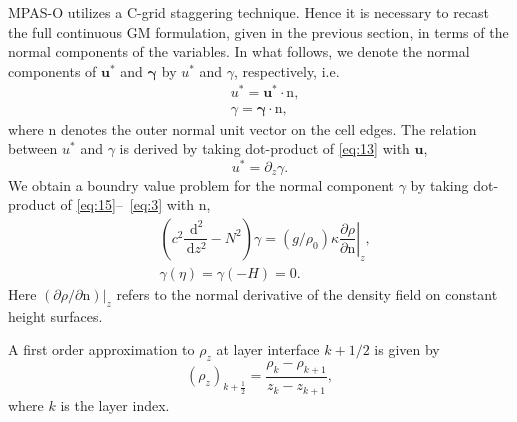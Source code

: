\documentclass[12pt]{report}
\def\p{\partial}
\def\bs{\boldsymbol}
\def\ud{\,\mathrm{d}}
\def\ub{\mathbf{u}}
\def\nb{\bs{\mathrm{n}}}
\begin{document}
MPAS-O utilizes a C-grid staggering technique. Hence it is necessary
to recast the full continuous GM formulation, given in the previous
section, in terms of the normal components of the variables. In what
follows, we denote the normal components of $\ub^\ast$ and
$\bs{\gamma}$ by $u^\ast$ and $\gamma$, respectively, i.e.
\begin{align}
  &u^\ast = \ub^\ast\cdot\nb,\label{eq:16}\\
  &\gamma = \bs{\gamma}\cdot\nb,\label{eq:17}
\end{align}
where $\nb$ denotes the outer normal unit vector on the cell
edges. The relation between $u^\ast$ and $\gamma$ is derived by
taking dot-product of \eqref{eq:13} with $\ub$,
\begin{equation}
  \label{eq:18}
  u^\ast = \p_z \gamma.
\end{equation}
We obtain a boundry value problem for the normal component $\gamma$ by
taking dot-product of \eqref{eq:15}--~\eqref{eq:3} with $\nb$,
\begin{align}
  &\left( c^2\dfrac{\ud^2}{\ud z^2} - N^2\right){\gamma} =
  \left.(g/\rho_0)\kappa \dfrac{\p \rho}{\p \mathrm{n}}\right|_z,\label{eq:19}\\
  &{\gamma}(\eta) = {\gamma}(-H) = 0.\label{eq:20}
\end{align}
Here $(\p \rho/\p\mathrm{n})|_z$ refers to the normal derivative of
the density field on constant height surfaces.


A first order 
approximation to $\rho_z$ at layer interface $k+1/2$ is given by 
\begin{equation}
  \left(\rho_z\right)_{k+\frac{1}{2}} = 
  \dfrac{\rho_k - \rho_{k+1}}{z_k - z_{k+1}},\label{eq:21}
\end{equation}
where $k$ is the layer index.
\end{document}
